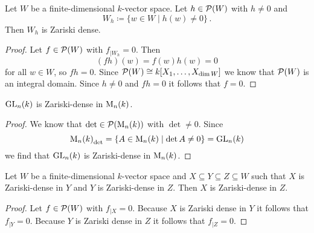 \begin{lemma}
  Let $W$ be a finite-dimensional $k$-vector space.
  Let $h \in \mathcal{P}(W)$ with $h \neq 0$ and
  \[
              W_h
    \coloneqq \{
                w \in W
              \mid
                h(w) \neq 0
              \} \,.
  \]
  Then $W_h$ is Zariski dense.
\end{lemma}
\begin{proof}
  Let $f \in \mathcal{P}(W)$ with $f_{|W_h} = 0$. Then
  \[
      (fh)(w)
    = f(w)h(w)
    = 0
  \]
  for all $w \in W$, so $fh = 0$.
  Since $\mathcal{P}(W) \cong k[X_1, \dotsc, X_{\dim W}]$ we know that $\mathcal{P}(W)$ is an integral domain.
  Since $h \neq 0$ and $fh = 0$ it follows that $f = 0$.
\end{proof}


\begin{corollary}
  $\operatorname{GL}_n(k)$ is Zariski-dense in $\operatorname{M}_n(k)$.
\end{corollary}
\begin{proof}
  We know that $\det \in \mathcal{P}(\operatorname{M}_n(k))$ with $\det \neq 0$.
  Since
  \[
    {\operatorname{M}_n(k)}_{\det}
    = \{
        A \in \operatorname{M}_n(k)
      \mid
        \det A \neq 0
      \}
    = \operatorname{GL}_n(k)
  \]
  we find that $\operatorname{GL}_n(k)$ is Zariski-dense in $\operatorname{M}_n(k)$.
\end{proof}


\begin{proposition}
  Let $W$ be a finite-dimensional $k$-vector space and $X \subseteq Y \subseteq Z \subseteq W$ such that $X$ is Zariski-dense in $Y$ and $Y$ is Zariski-dense in $Z$.
  Then $X$ is Zariski-dense in $Z$.
\end{proposition}
\begin{proof}
  Let $f \in \mathcal{P}(W)$ with $f_{|X} = 0$.
  Because $X$ is Zariski dense in $Y$ it follows that $f_{|Y} = 0$.
  Because $Y$ is Zariski dense in $Z$ it follows that $f_{|Z} = 0$.
\end{proof}


